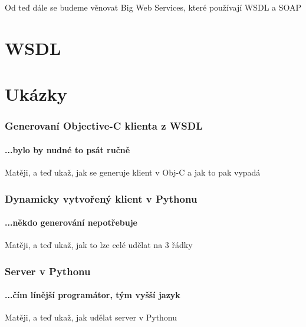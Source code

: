 \documentclass[12pt]{beamer}
\begin{document}
\begin{frame}
  \begin{example}
    Od teď dále se budeme věnovat Big Web Services, které používají WSDL a SOAP
  \end{example}
\end{frame}

\section{WSDL}

\section{Ukázky}

\begin{frame}
  \frametitle{Generovaní Objective-C klienta z WSDL}
  \framesubtitle{...bylo by nudné to psát ručně}

  \begin{example}
    Matěji, a teď ukaž, jak se generuje klient v Obj-C a jak to pak vypadá
  \end{example}
\end{frame}

\begin{frame}
  \frametitle{Dynamicky vytvořený klient v Pythonu}
  \framesubtitle{...někdo generování nepotřebuje}

  \begin{example}
    Matěji, a teď ukaž, jak to lze celé udělat na 3 řádky
  \end{example}
\end{frame}

\begin{frame}
  \frametitle{Server v Pythonu}
  \framesubtitle{...čím línější programátor, tým vyšší jazyk}

  \begin{example}
    Matěji, a teď ukaž, jak udělat server v Pythonu
  \end{example}
\end{frame}


\end{document}
